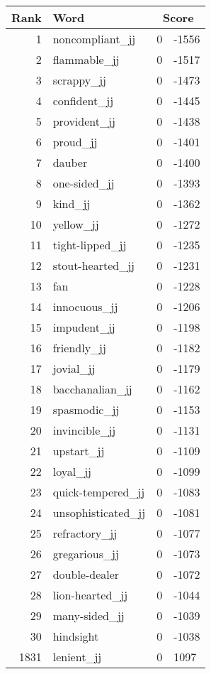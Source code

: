 \begin{longtable}[!htbp]{| rlr@{.}l |}
    \hline
    \textbf{Rank} & \textbf{Word} & \multicolumn{2}{c|}{\textbf{Score}} \\
    \hline
    \endhead
    1 & noncompliant\_jj & 0 & -1556 \\
    2 & flammable\_jj & 0 & -1517 \\
    3 & scrappy\_jj & 0 & -1473 \\
    4 & confident\_jj & 0 & -1445 \\
    5 & provident\_jj & 0 & -1438 \\
    6 & proud\_jj & 0 & -1401 \\
    7 & dauber & 0 & -1400 \\
    8 & one-sided\_jj & 0 & -1393 \\
    9 & kind\_jj & 0 & -1362 \\
    10 & yellow\_jj & 0 & -1272 \\
    11 & tight-lipped\_jj & 0 & -1235 \\
    12 & stout-hearted\_jj & 0 & -1231 \\
    13 & fan & 0 & -1228 \\
    14 & innocuous\_jj & 0 & -1206 \\
    15 & impudent\_jj & 0 & -1198 \\
    16 & friendly\_jj & 0 & -1182 \\
    17 & jovial\_jj & 0 & -1179 \\
    18 & bacchanalian\_jj & 0 & -1162 \\
    19 & spasmodic\_jj & 0 & -1153 \\
    20 & invincible\_jj & 0 & -1131 \\
    21 & upstart\_jj & 0 & -1109 \\
    22 & loyal\_jj & 0 & -1099 \\
    23 & quick-tempered\_jj & 0 & -1083 \\
    24 & unsophisticated\_jj & 0 & -1081 \\
    25 & refractory\_jj & 0 & -1077 \\
    26 & gregarious\_jj & 0 & -1073 \\
    27 & double-dealer & 0 & -1072 \\
    28 & lion-hearted\_jj & 0 & -1044 \\
    29 & many-sided\_jj & 0 & -1039 \\
    30 & hindsight & 0 & -1038 \\
    1831 & lenient\_jj & 0 & 1097 \\

\end{longtable}
